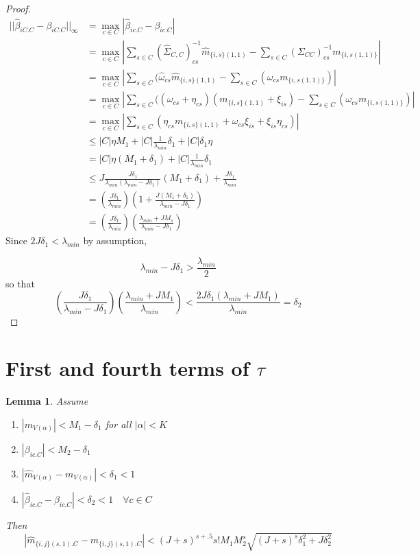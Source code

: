 \documentclass[]{article}
\newtheorem{lemma}{Lemma}
\begin{document}
\begin{proof}
\begin{equation}
\begin{aligned}
|| \hat \beta_{iC.C} - \beta_{iC.C} ||_\infty &= \max_{c \in C} |\hat \beta_{ic.C} - \beta_{ic.C}|\\
& = \max_{c \in C} |\sum_{s \in C}(\hat \Sigma_{C,C})^{-1}_{cs}\hat m_{\{i,s\}(1,1)} - \sum_{s\in C}(\Sigma_{CC})^{-1}_{cs}m_{\{i,s(1,1)\}}|
\\
& = \max_{c \in C} |\sum_{s \in C}(\hat\omega_{cs}\hat m_{\{i,s\}(1,1)} - \sum_{s\in C}( \omega_{cs}m_{\{i,s(1,1)\}})|
\\
& = \max_{c \in C} |\sum_{s \in C}((\omega_{cs} + \eta_{cs})( m_{\{i,s\}(1,1)} + \xi_{is}) - \sum_{s\in C}(\omega_{cs}m_{\{i,s(1,1)\}})|
\\
& = \max_{c \in C} |\sum_{s \in C}(\eta_{cs}m_{\{i,s\}(1,1)} +\omega_{cs}\xi_{is} + \xi_{is}\eta_{cs})|
\\
& \leq |C| \eta M_1 +|C| \frac{1}{\lambda_{min}}\delta_1 + |C|\delta_1 \eta
\\
& = |C| \eta (M_1  +  \delta_1) +|C| \frac{1}{\lambda_{min}}\delta_1
\\
& \leq J \frac{J\delta_1}{\lambda_{min}(\lambda_{min} - J\delta_1)} (M_1 + \delta_1) + \frac{J \delta_1}{\lambda_{min}} \\
& = \left(\frac{J \delta_1}{\lambda_{min}} \right)\left(1 + \frac{J(M_1 + \delta_1)}{\lambda_{min} - J\delta_1}\right)\\
& = \left(\frac{J \delta_1}{\lambda_{min}} \right)\left( \frac{\lambda_{min} + J M_1}{\lambda_{min} - J\delta_1}\right)
\end{aligned}
\end{equation} 
Since $2J\delta_1 < \lambda_{min}$ by assumption,

\[\lambda_{min} - J\delta_1 > \frac{\lambda_{min}}{2}\]
so that 
\begin{equation}
\left(\frac{J \delta_1}{\lambda_{min} - J\delta_1} \right)\left( \frac{\lambda_{min} + J M_1}{\lambda_{min}}\right) < \frac{2J \delta_1 \left( \lambda_{min} + J M_1\right)}{\lambda_{min}} = \delta_2 
\end{equation}
\end{proof}

\section{First and fourth terms of $\tau$}

\begin{lemma}
Assume
\begin{enumerate}
\item $|m_{V(\alpha)}| < M_1 - \delta_1 $ for all $|\alpha| < K$
\item  $|\beta_{ic.C}| < M_2 - \delta_1 $
\item $|\hat m_{V(\alpha)} - m_{V(\alpha)}| < \delta_1 < 1$
\item$|\hat \beta_{ic.C} - \beta_{ic.C}| < \delta_2 < 1 \quad \forall c \in C$
\end{enumerate} 

Then
\[|\hat m_{\{i,j\}(s,1).C} - m_{\{i,j\}(s,1).C}|  < (J+s)^{s + .5}s!M_1M_2^s \sqrt{(J+s)^s\delta_1^2 + J \delta_2^2}\]
\end{lemma}
\end{document}
